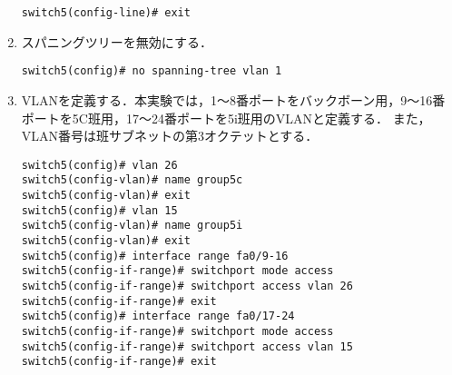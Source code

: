 \begin{enumerate}
\begin{lstlisting}
switch5(config-line)# exit
\end{lstlisting}
    \item スパニングツリーを無効にする．
          \begin{lstlisting}
switch5(config)# no spanning-tree vlan 1
    \end{lstlisting}
    \item VLANを定義する．本実験では，1〜8番ポートをバックボーン用，9〜16番ポートを5C班用，17〜24番ポートを5i班用のVLANと定義する．
          また，VLAN番号は班サブネットの第3オクテットとする．
          \begin{lstlisting}
switch5(config)# vlan 26
switch5(config-vlan)# name group5c
switch5(config-vlan)# exit
switch5(config)# vlan 15
switch5(config-vlan)# name group5i
switch5(config-vlan)# exit
switch5(config)# interface range fa0/9-16
switch5(config-if-range)# switchport mode access
switch5(config-if-range)# switchport access vlan 26
switch5(config-if-range)# exit
switch5(config)# interface range fa0/17-24
switch5(config-if-range)# switchport mode access
switch5(config-if-range)# switchport access vlan 15
switch5(config-if-range)# exit
\end{lstlisting}
\end{enumerate}
